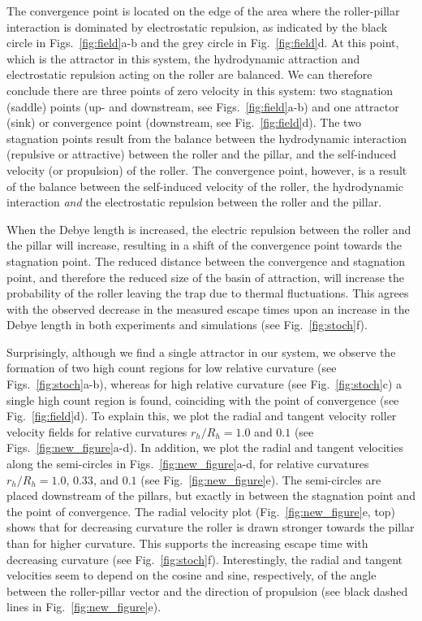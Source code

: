 \documentclass[12pt]{article}
\begin{document}
The convergence point is located on the edge of the area where the roller-pillar interaction is dominated by electrostatic repulsion, as indicated by the black circle in Figs.~\ref{fig:field}a-b and the grey circle in Fig.~\ref{fig:field}d. At this point, which is the attractor in this system, the hydrodynamic attraction and electrostatic repulsion acting on the roller are balanced. We can therefore conclude there are three points of zero velocity in this system: two stagnation (saddle) points (up- and downstream, see Figs.~\ref{fig:field}a-b) and one attractor (sink) or convergence point (downstream, see Fig.~\ref{fig:field}d). The two stagnation points result from the balance between the hydrodynamic interaction (repulsive or attractive) between the roller and the pillar, and the self-induced velocity (or propulsion) of the roller. The convergence point, however, is a result of the balance between  the self-induced velocity of the roller, the hydrodynamic interaction \textit{and} the electrostatic repulsion between the roller and the pillar.

When the Debye length is increased, the electric repulsion between the roller and the pillar will increase, resulting in a shift of the convergence point towards the stagnation point. The reduced distance between the convergence and stagnation point, and therefore the reduced size of the basin of attraction, will increase the probability of the roller leaving the trap due to thermal fluctuations. This agrees with the observed decrease in the measured escape times upon an increase in the Debye length in both experiments and simulations (see Fig.~\ref{fig:stoch}f).

Surprisingly, although we find a single attractor in our system, we observe the formation of two high count regions for low relative curvature (see Figs.~\ref{fig:stoch}a-b), whereas for high relative curvature (see Fig.~\ref{fig:stoch}c) a single high count region is found, coinciding with the point of convergence (see Fig.~\ref{fig:field}d).
To explain this, we plot the radial and tangent velocity roller velocity fields for relative curvatures $r_h/R_h = 1.0$ and $0.1$ (see Figs.~\ref{fig:new_figure}a-d). In addition, we plot the radial and tangent velocities along the semi-circles in Figs.~\ref{fig:new_figure}a-d, for relative curvatures $r_h/R_h=1.0$, $0.33$, and $0.1$ (see Fig.~\ref{fig:new_figure}e). The semi-circles are placed downstream of the pillars, but exactly in between the stagnation point and the point of convergence. The radial velocity plot (Fig.~\ref{fig:new_figure}e, top) shows that for decreasing curvature the roller is drawn stronger towards the pillar than for higher curvature. This supports the increasing escape time with decreasing curvature (see Fig.~\ref{fig:stoch}f). 
Interestingly, the radial and tangent velocities seem to depend on the cosine and sine, respectively, of the angle between the roller-pillar vector and the direction of propulsion (see black dashed lines in Fig.~\ref{fig:new_figure}e).
\end{document}
